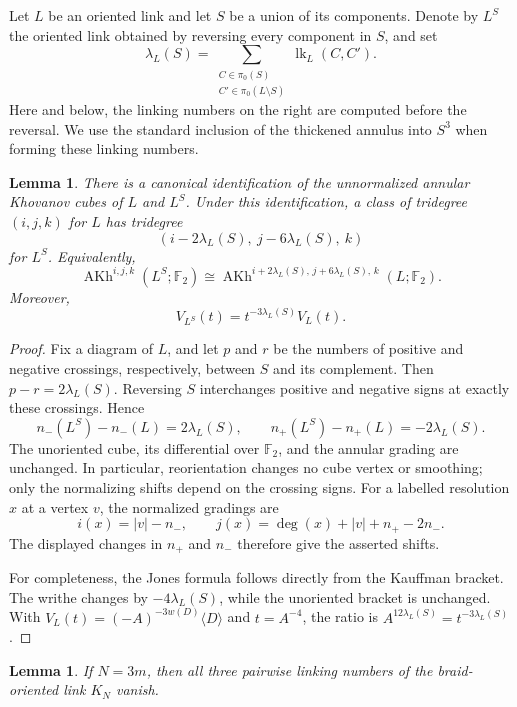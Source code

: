 \documentclass[10pt,a4paper]{amsart}
\newtheorem{lemma}[theorem]{Lemma}
\newcommand{\F}{\mathbb F_2}
\newcommand{\AKh}{\operatorname{AKh}}
\begin{document}
Let \(L\) be an oriented link and let \(S\) be a union of its components.  Denote by
\(L^S\) the oriented link obtained by reversing every component in \(S\), and set
\[
  \lambda_L(S)
  =\sum_{\substack{C\in\pi_0(S)\\ C'\in\pi_0(L\setminus S)}}
     \operatorname{lk}_L(C,C').
\]
Here and below, the linking numbers on the right are computed before the reversal.
We use the standard inclusion of the thickened annulus into \(S^3\) when forming
these linking numbers.

\begin{lemma}\label{lem:reorientation}
There is a canonical identification of the unnormalized annular Khovanov cubes of
\(L\) and \(L^S\).  Under this identification, a class of tridegree \((i,j,k)\) for
\(L\) has tridegree
\[
  (i-2\lambda_L(S),\ j-6\lambda_L(S),\ k)
\]
for \(L^S\).  Equivalently,
\[
  \AKh^{i,j,k}(L^S;\F)
  \cong
  \AKh^{i+2\lambda_L(S),\,j+6\lambda_L(S),\,k}(L;\F).
\]
Moreover,
\begin{equation}\label{eq:jones-reorientation}
  V_{L^S}(t)=t^{-3\lambda_L(S)}V_L(t).
\end{equation}
\end{lemma}

\begin{proof}
Fix a diagram of \(L\), and let \(p\) and \(r\) be the numbers of positive and
negative crossings, respectively, between \(S\) and its complement.  Then
\(p-r=2\lambda_L(S)\).  Reversing \(S\) interchanges positive and negative signs at
exactly these crossings.  Hence
\[
 n_-(L^S)-n_-(L)=2\lambda_L(S),
 \qquad
 n_+(L^S)-n_+(L)=-2\lambda_L(S).
\]
The unoriented cube, its differential over \(\F\), and the annular grading are
unchanged.  In particular, reorientation changes no cube vertex or smoothing; only
the normalizing shifts depend on the crossing signs.  For a labelled resolution \(x\)
at a vertex \(v\), the normalized
gradings are
\[
 i(x)=|v|-n_-,
 \qquad
 j(x)=\deg(x)+|v|+n_+-2n_-.
\]
The displayed changes in \(n_+\) and \(n_-\) therefore give the asserted shifts.

For completeness, the Jones formula follows directly from the Kauffman bracket.
The writhe changes by \(-4\lambda_L(S)\), while the unoriented bracket is unchanged.
With \(V_L(t)=(-A)^{-3w(D)}\langle D\rangle\) and \(t=A^{-4}\), the ratio is
\(A^{12\lambda_L(S)}=t^{-3\lambda_L(S)}\).
\end{proof}

\begin{lemma}\label{lem:target-linking}
If \(N=3m\), then all three pairwise linking numbers of the braid-oriented link
\(K_N\) vanish.
\end{lemma}
\end{document}
